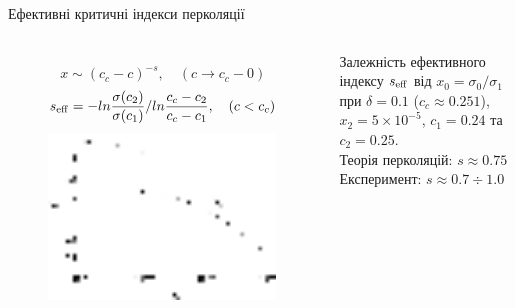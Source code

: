 \documentclass[10pt]{beamer}
\begin{document}
\begin{frame}{Ефективні критичні індекси перколяції}
\begin{columns}[T,onlytextwidth]
      \begin{figure}
        \centering
        $$x \sim (c_c-c)^{-s}, \quad (c \to c_c-0)$$
        $$s_{\rm eff} = - ln \frac{\sigma(c_2)}{\sigma(c_1)} / ln \frac{c_c-c_2}{c_c - c_1}, \quad (c<c_c)$$
        \includegraphics[width=0.99\textwidth]{images/seff.eps}
      \end{figure}
      \hfill
      \begin{minipage}[t]{0.9\textwidth}
        Залежність ефективного індексу $s_{\rm eff}$ від $x_0 = \sigma_0/\sigma_1$ при  $\delta=0.1$ ($c_c \approx 0.251$), $x_2 = 5\times 10^{-5}$, $c_1 = 0.24$ та $c_2 = 0.25$.\\
        Теорія перколяцій: $s \approx 0.75$\\
        Експеримент: $s\approx 0.7 \div 1.0$
      \end{minipage}
\end{columns}

\end{frame}


\end{document}
